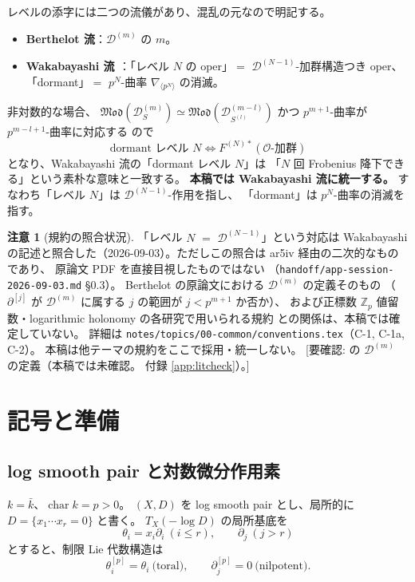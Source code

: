 \documentclass[a4paper,11pt]{ltjsarticle}
\theoremstyle{plain}
\theoremstyle{definition}
\newtheorem{remark}[theorem]{注意}
\newcommand{\NeedsCheck}[1]{\textcolor{blue!70!black}{\textsf{[要確認: #1]}}}
\newcommand{\bbZ}{\mathbb{Z}}
\newcommand{\cD}{\mathcal{D}}
\newcommand{\cO}{\mathcal{O}}
\begin{document}
レベルの添字には二つの流儀があり、混乱の元なので明記する。
\begin{itemize}[leftmargin=1.6em]
\item \textbf{Berthelot 流}：$\cD^{(m)}$ の $m$。
\item \textbf{Wakabayashi 流 \cite{Wak}}：「レベル $N$ の oper」$=$ $\cD^{(N-1)}$-加群構造つき oper、
      「dormant」$=$ $p^N$-曲率 $\nabla_{\langle p^N\rangle}$ の消滅。
\end{itemize}
非対数的な場合、
$\mathfrak{Mod}(\cD^{(m)}_S)\simeq\mathfrak{Mod}(\cD^{(m-l)}_{S^{(l)}})$ かつ
$p^{m+1}$-曲率が $p^{m-l+1}$-曲率に対応する \cite[Prop.~2.1.5]{Wak} ので
\[
  \text{dormant レベル }N \iff F^{(N)*}(\cO\text{-加群})
\]
となり、Wakabayashi 流の「dormant レベル $N$」は
「$N$ 回 Frobenius 降下できる」という素朴な意味と一致する。
\textbf{本稿では Wakabayashi 流に統一する。}
すなわち「レベル $N$」は $\cD^{(N-1)}$-作用を指し、
「dormant」は $p^N$-曲率の消滅を指す。

\begin{remark}[規約の照合状況]\label{rem:conv-status}
「レベル $N$ $=$ $\cD^{(N-1)}$」という対応は Wakabayashi \cite[\S4.2]{Wak}
の記述と照合した（2026-09-03）。ただしこの照合は ar5iv 経由の二次的なものであり、
原論文 PDF を直接目視したものではない
（\texttt{handoff/app-session-2026-09-03.md} \S0.3）。
Berthelot \cite{Ber1} の原論文における $\cD^{(m)}$ の定義そのもの
（$\partial^{[j]}$ が $\cD^{(m)}$ に属する $j$ の範囲が $j<p^{m+1}$ か否か）、
および正標数 $\bbZ_p$ 値留数・logarithmic holonomy の各研究で用いられる規約
との関係は、本稿では確定していない。
詳細は \texttt{notes/topics/00-common/conventions.tex}（C-1, C-1a, C-2）。
本稿は他テーマの規約をここで採用・統一しない。
\NeedsCheck{\cite[\S1.1--1.2]{Ber1} の $\cD^{(m)}$ の定義（本稿では未確認。
付録 \ref{app:litcheck}）。}
\end{remark}

\section{記号と準備}\label{sec:notation}

\subsection{log smooth pair と対数微分作用素}

$k=\bar k$、$\operatorname{char}k=p>0$。
$(X,D)$ を log smooth pair とし、局所的に $D=\{x_1\cdots x_r=0\}$ と書く。
$T_X(-\log D)$ の局所基底を
\[
  \theta_i=x_i\partial_i\ (i\le r),\qquad \partial_j\ (j>r)
\]
とすると、制限 Lie 代数構造は
\[
  \theta_i^{[p]}=\theta_i\ \text{(toral)},\qquad \partial_j^{[p]}=0\ \text{(nilpotent)} .
\]
\end{document}
